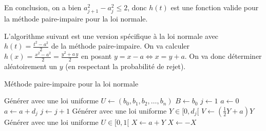 En conclusion, on a bien $a_{j+1}^2 - a_j^2\leq2$, donc $h(t)$ est une fonction valide pour la méthode paire-impaire pour la loi normale.

L'algorithme suivant est une version spécifique à la loi normale avec $h(t) = \frac{t^2-a^2}{2}$ de la méthode paire-impaire. On va calculer $h(x) = \frac{x^2-a^2}{2} = \frac{y^2 + a\,y}{2}$ en posant $y = x-a \iff x = y + a$. On va donc déterminer aléatoirement un $y$ (en respectant la probabilité de rejet).

\begin{algorithm}[H]
    \caption{Méthode paire-impaire pour la loi normale}
    \begin{algorithmic}[1]
        \State Générer avec une loi uniforme $U \gets (b_0, b_1, b_2, \dots, b_n)$ 
        \State $B \gets b_0$
        \State $j \gets 1$
        \State $a \gets 0$
         
            \State $a \gets a + d_j$
            \State $j \gets j + 1$
        \EndWhile {}
        \Do
            \State Générer avec une loi uniforme $Y \in [0, d_j[$ 
            \State $V \gets (\frac{1}{2}Y + a)Y$
            \Do
                \State Générer avec une loi uniforme $U \in [0, 1[$
         
        \State $X \gets a + Y$ 
            \State $X \gets -X$
        \EndIf
    \end{algorithmic}
\end{algorithm}
